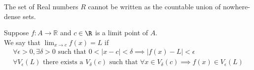 \documentclass[answers,12pt,addpoints]{exam}
\begin{document}
\begin{definition}
    The set of Real numbers $R$ cannot be written as the countable union of nowhere-dense sets.
\end{definition}
\begin{definition}
    Suppose $f: A \to \mathbb{R}$ and $c \in \R$ is a limit point of $A$.\\
    We say that $\lim_{x \to c} f(x) = L$ if \\
    \begin{align*}
        \forall \epsilon > 0, \exists \delta > 0 \text{ such that } 0 < |x - c| < \delta \implies |f(x) - L| < \epsilon\\
        \forall V_\epsilon(L) \text{ there exists a } V_\delta(c) \text{ such that } \forall x \in V_\delta(c) \implies f(x) \in V_\epsilon(L)
    \end{align*}
\end{definition}
\end{document}
